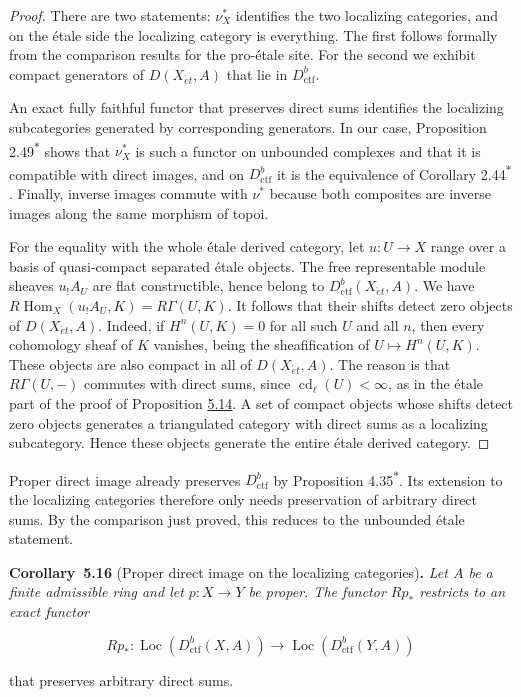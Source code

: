 \documentclass[11pt]{article}
\newenvironment{bpstatement}[2]{\par\addvspace{0.6\baselineskip}\noindent\textbf{#1}#2\textbf{.}\enspace\ignorespaces}
  {\par\addvspace{0.4\baselineskip}}
\newenvironment{bpstatementit}[2]{\begin{bpstatement}{#1}{#2}\itshape\ignorespaces}{\end{bpstatement}}
\newcommand{\bpout}[1]{#1\textsuperscript{\hyperlink{bp-outside}{\ensuremath{\ast}}}}
\providecommand{\Loc}{}\renewcommand{\Loc}{\operatorname{Loc}}
\begin{document}
\begin{proof}[{Proof}]\label{bp49}%
There are two statements: \(\nu_X^*\) identifies the two localizing categories, and on the étale side the localizing category is everything. The first follows formally from the comparison results for the pro-étale site. For the second we exhibit compact generators of \(D(X_{\acute{e}t},A)\) that lie in \(D^b_{\mathrm{ctf}}\).

An exact fully faithful functor that preserves direct sums identifies the localizing subcategories generated by corresponding generators. In our case, Proposition \bpout{2.49} shows that \(\nu_X^*\) is such a functor on unbounded complexes and that it is compatible with direct images, and on \(D^b_{\mathrm{ctf}}\) it is the equivalence of Corollary \bpout{2.44}. Finally, inverse images commute with \(\nu^*\) because both composites are inverse images along the same morphism of topoi.

For the equality with the whole étale derived category, let \(u:U\to X\) range over a basis of quasi-compact separated étale objects. The free representable module sheaves \(u_!A_U\) are flat constructible, hence belong to \(D^b_{\mathrm{ctf}}(X_{\acute{e}t},A)\). We have \(R\!\operatorname{Hom}_X(u_!A_U,K)=R\Gamma(U,K)\). It follows that their shifts detect zero objects of \(D(X_{\acute{e}t},A)\). Indeed, if \(H^n(U,K)=0\) for all such \(U\) and all \(n\), then every cohomology sheaf of \(K\) vanishes, being the sheafification of \(U\mapsto H^n(U,K)\). These objects are also compact in all of \(D(X_{\acute{e}t},A)\). The reason is that \(R\Gamma(U,-)\) commutes with direct sums, since \(\operatorname{cd}_\ell(U)<\infty\), as in the étale part of the proof of Proposition \hyperref[bp45]{5.14}. A set of compact objects whose shifts detect zero objects generates a triangulated category with direct sums as a localizing subcategory. Hence these objects generate the entire étale derived category.
\end{proof}

\label{bp50}%
Proper direct image already preserves \(D^b_{\mathrm{ctf}}\) by Proposition \bpout{4.35}. Its extension to the localizing categories therefore only needs preservation of arbitrary direct sums. By the comparison just proved, this reduces to the unbounded étale statement.

\label{bp51}%
\begin{bpstatementit}{Corollary~5.16}{ (Proper direct image on the localizing categories)}
Let \(A\) be a finite admissible ring and let \(p:X\to Y\) be proper. The functor \(Rp_*\) restricts to an exact functor

\[
Rp_*:\Loc(D^b_{\mathrm{ctf}}(X,A))\longrightarrow\Loc(D^b_{\mathrm{ctf}}(Y,A))
\]

that preserves arbitrary direct sums.
\end{bpstatementit}
\end{document}

